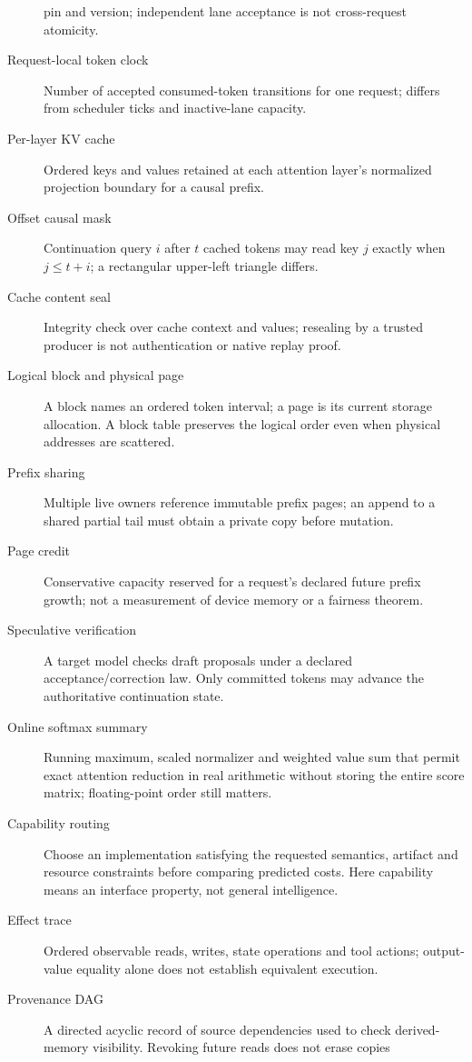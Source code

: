 \begin{description}
pin and version; independent lane acceptance is not cross-request atomicity.
\item[Request-local token clock] Number of accepted consumed-token transitions
for one request; differs from scheduler ticks and inactive-lane capacity.
\item[Per-layer KV cache] Ordered keys and values retained at each attention
layer's normalized projection boundary for a causal prefix.
\item[Offset causal mask] Continuation query $i$ after $t$ cached tokens may
read key $j$ exactly when $j\le t+i$; a rectangular upper-left triangle differs.
\item[Cache content seal] Integrity check over cache context and values;
resealing by a trusted producer is not authentication or native replay proof.
\item[Logical block and physical page] A block names an ordered token interval;
a page is its current storage allocation. A block table preserves the logical
order even when physical addresses are scattered.
\item[Prefix sharing] Multiple live owners reference immutable prefix pages;
an append to a shared partial tail must obtain a private copy before mutation.
\item[Page credit] Conservative capacity reserved for a request's declared
future prefix growth; not a measurement of device memory or a fairness theorem.
\item[Speculative verification] A target model checks draft proposals under a
declared acceptance/correction law. Only committed tokens may advance the
authoritative continuation state.
\item[Online softmax summary] Running maximum, scaled normalizer and weighted
value sum that permit exact attention reduction in real arithmetic without
storing the entire score matrix; floating-point order still matters.
\item[Capability routing] Choose an implementation satisfying the requested
semantics, artifact and resource constraints before comparing predicted costs.
Here capability means an interface property, not general intelligence.
\item[Effect trace] Ordered observable reads, writes, state operations and tool
actions; output-value equality alone does not establish equivalent execution.
\item[Provenance DAG] A directed acyclic record of source dependencies used to
check derived-memory visibility. Revoking future reads does not erase copies

\end{description}
